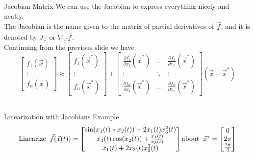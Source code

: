 \documentclass{beamer}
\begin{document}
\begin{frame}{Jacobian Matrix}
We can use the Jacobian to express everything nicely and neatly. \\
The Jacobian is the name given to the matrix of partial derivatives of $\vec{f}$, and it is denoted by $J_{\vec{x}}$ or $\nabla_{\vec{x}}\vec{f}$. \\ \pause
Continuing from the previous slide we have: \\
\[
\begin{bmatrix} f_1(\vec{x}) \\ \vdots \\f_n(\vec{x}) \end{bmatrix} \approx 
\begin{bmatrix} f_1(\vec{x}^*) \\ \vdots \\f_n(\vec{x}^*) \end{bmatrix} + 
\begin{bmatrix} \frac{\partial f_1}{\partial x_1}(\vec{x}^*)& \hdots& \frac{\partial f_1}{\partial x_n}(\vec{x}^*) \\ \vdots & \ddots &\vdots \\ \frac{\partial f_n}{\partial x_1}(\vec{x}^*)& \hdots &  \frac{\partial f_n}{\partial x_n}(\vec{x}^*) \end{bmatrix}
(\vec{x} - \vec{x}^*)
\]
\\

\end{frame}

\begin{frame}{Linearization with Jacobians Example}
\begin{align*}
\text{Linearize}  \hspace{0.2 cm} 
\vec{f}(\vec{x}(t))  = 
\begin{bmatrix}
\sin(x_1(t)*x_2(t)) + 2x_1(t)x_3^2(t)\\
x_3(t)\cos(x_2(t)) + \frac{x_1(t)}{x_3(t)}\\
x_1(t) + 2x_3(t)x_2^3(t)
\end{bmatrix} 
\text{about} \hspace{0.2 cm} \vec{x}^* = \begin{bmatrix}
0\\ 2 \pi \\ \frac{2 \pi}{3}
\end{bmatrix} 
\end{align*}
\end{frame}
\end{document}
